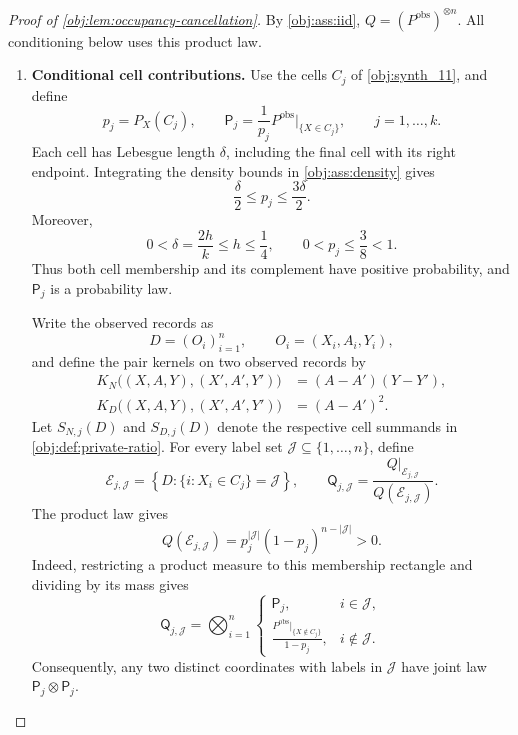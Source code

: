 \documentclass[11pt]{article}
\begin{document}
\begin{proof}[Proof of \cref{obj:lem:occupancy-cancellation}]
By \cref{obj:ass:iid}, \(Q=(P^{\mathrm{obs}})^{\otimes n}\). All conditioning below uses this product law.

\begin{enumerate}
\item \textbf{Conditional cell contributions.}
Use the cells \(C_j\) of \cref{obj:synth_11}, and define
\[
p_j=P_X(C_j),\qquad
\mathsf P_j=\frac{1}{p_j}
 P^{\mathrm{obs}}\big|_{\{X\in C_j\}},
\qquad j=1,\ldots,k.
\]
Each cell has Lebesgue length \(\delta\), including the final cell with its right endpoint. Integrating the density bounds in \cref{obj:ass:density} gives
\[
\frac{\delta}{2}\le p_j\le\frac{3\delta}{2}.
\]
Moreover,
\[
0<\delta=\frac{2h}{k}\le h\le\frac14,
\qquad
0<p_j\le\frac38<1.
\]
Thus both cell membership and its complement have positive probability, and \(\mathsf P_j\) is a probability law.

Write the observed records as
\[
D=(O_i)_{i=1}^n,\qquad O_i=(X_i,A_i,Y_i),
\]
and define the pair kernels on two observed records by
\[
\begin{aligned}
K_N\bigl((X,A,Y),(X',A',Y')\bigr)
  &=(A-A')(Y-Y'),\\
K_D\bigl((X,A,Y),(X',A',Y')\bigr)
  &=(A-A')^2.
\end{aligned}
\]
Let \(S_{N,j}(D)\) and \(S_{D,j}(D)\) denote the respective cell summands in \cref{obj:def:private-ratio}. For every label set
\(\mathcal J\subseteq\{1,\ldots,n\}\), define
\[
\mathcal E_{j,\mathcal J}
=
\left\{D:\{i:X_i\in C_j\}=\mathcal J\right\},
\qquad
\mathsf Q_{j,\mathcal J}
=
\frac{Q|_{\mathcal E_{j,\mathcal J}}}
     {Q(\mathcal E_{j,\mathcal J})}.
\]
The product law gives
\[
Q(\mathcal E_{j,\mathcal J})
=p_j^{|\mathcal J|}(1-p_j)^{n-|\mathcal J|}>0.
\]
Indeed, restricting a product measure to this membership rectangle and dividing by its mass gives
\[
\mathsf Q_{j,\mathcal J}
=
\bigotimes_{i=1}^n
\begin{cases}
\mathsf P_j,&i\in\mathcal J,\\[2pt]
\displaystyle
\frac{P^{\mathrm{obs}}|_{\{X\notin C_j\}}}{1-p_j},
&i\notin\mathcal J.
\end{cases}
\]
Consequently, any two distinct coordinates with labels in \(\mathcal J\) have joint law
\(\mathsf P_j\otimes\mathsf P_j\).


\end{enumerate}
\end{proof}
\end{document}
